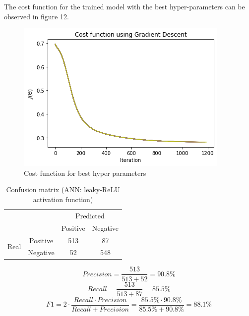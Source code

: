 \documentclass[conference]{IEEEtran}
\begin{document}
The cost function for the trained model with the best hyper-parameters can be observed in figure 12.
\begin{figure}[H]
\centering
\includegraphics[scale=0.6]{CostFuncTrainLEAKYRELU.png}
\caption{Cost function for best hyper parameters}
\label{fig:kfoldsiter}
\end{figure}

\begin{table}[H]
\centering
\caption{Confusion matrix (ANN: leaky-ReLU activation function)}
\label{tab:my-table}
\begin{tabular}{cccc}
                                       &                       & \multicolumn{2}{c}{Predicted}                          \\ \cline{3-4} 
                                       & \multicolumn{1}{c|}{} & \multicolumn{1}{c|}{Positive} & \multicolumn{1}{c|}{Negative} \\ \cline{2-4} 
\multicolumn{1}{c|}{\multirow{2}{*}{Real}} & \multicolumn{1}{c|}{Positive} & \multicolumn{1}{c|}{513} & \multicolumn{1}{c|}{87} \\ \cline{2-4} 
\multicolumn{1}{c|}{}                  & \multicolumn{1}{c|}{Negative} & \multicolumn{1}{c|}{52} & \multicolumn{1}{c|}{548} \\ \cline{2-4} 
\end{tabular}
\end{table}

\begin{equation}
    Precision = \frac{513}{513+52} = 90.8\%
    \label{eq9}
\end{equation}
\begin{equation}
    Recall = \frac{513}{513+87} = 85.5\%
    \label{eq10}
\end{equation}
\begin{equation}
    F1 = 2 \cdot \frac{Recall \cdot Precision}{Recall+Precision} = \frac{85.5\% \cdot 90.8\%}{85.5\%+90.8\%} = 88.1\%
    \label{eq11}
\end{equation}
\end{document}
